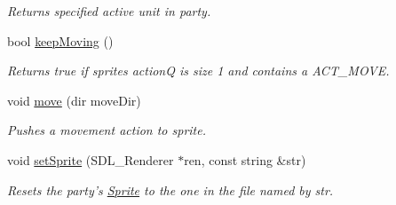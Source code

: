 \begin{DoxyCompactItemize}
\begin{DoxyCompactList}\small\item\em Returns specified active unit in party. \end{DoxyCompactList}\item 
bool \hyperlink{class_party_a6f451a4240a85e639eb27fec57c78489}{keep\+Moving} ()\hypertarget{class_party_a6f451a4240a85e639eb27fec57c78489}{}\label{class_party_a6f451a4240a85e639eb27fec57c78489}

\begin{DoxyCompactList}\small\item\em Returns true if sprite\textquotesingle{}s actionQ is size 1 and contains a A\+C\+T\+\_\+\+M\+O\+VE. \end{DoxyCompactList}\item 
void \hyperlink{class_party_add5689250e5be0aece41d1aedd7bef5b}{move} (dir move\+Dir)\hypertarget{class_party_add5689250e5be0aece41d1aedd7bef5b}{}\label{class_party_add5689250e5be0aece41d1aedd7bef5b}

\begin{DoxyCompactList}\small\item\em Pushes a movement action to sprite. \end{DoxyCompactList}\item 
void \hyperlink{class_party_abe069ffbbf3352f6b39246c8382dd26b}{set\+Sprite} (S\+D\+L\+\_\+\+Renderer $\ast$ren, const string \&str)\hypertarget{class_party_abe069ffbbf3352f6b39246c8382dd26b}{}\label{class_party_abe069ffbbf3352f6b39246c8382dd26b}

\begin{DoxyCompactList}\small\item\em Resets the party’s \hyperlink{class_sprite}{Sprite} to the one in the file named by str. \end{DoxyCompactList}\end{DoxyCompactItemize}
